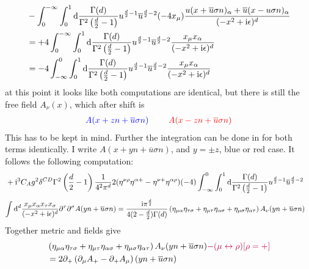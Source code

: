 {\color{red}
\begin{align}
	&-\int_{0}^{-\infty}\int_0^1 \text{d} \frac{\Gamma(d)}{\Gamma^2\left(\frac{d}{2}-1\right)} u^{\frac{d}{2}-1}\overline u ^{\frac{d}{2}-2}(-4x_\mu)\frac{u(x+\overline u \sigma n)_\alpha + \overline u(x- u\sigma n)_\alpha}{(-x^2+\text{i} \epsilon)^{d}}
	\\
	&=
	+4\int_{0}^{-\infty}\int_0^1 \text{d}  \frac{\Gamma(d)}{\Gamma^2\left(\frac{d}{2}-1\right)} u^{\frac{d}{2}-1}\overline u ^{\frac{d}{2}-2}\frac{x_\mu x_\alpha}{(-x^2+\text{i} \epsilon)^{d}}
	\\
	&=
	-4\int_{-\infty}^{0}\int_0^1 \text{d} \frac{\Gamma(d)}{\Gamma^2\left(\frac{d}{2}-1\right)} u^{\frac{d}{2}-1}\overline u ^{\frac{d}{2}-2}\frac{x_\mu x_\alpha}{(-x^2+\text{i} \epsilon)^{d}}
\end{align}
}
at this point it looks like both computations are identical, but there is still the free field $A_\nu(x)$, which after shift is
\begin{align}
	{\color{blue}A(x+zn+\overline u \sigma n)} ~~~~~~~ {\color{red}A(x-zn+\overline u \sigma n)}
\end{align}
This has to be kept in mind. 
Further the integration can be done in for both terms identically. I write $A(x+yn+\overline u \sigma n)$, and $y=\pm z$, blue or red case. It follows the following computation:
\begin{align}
	&+\text{i}^3 C_A g^2 \delta^{CD}\Gamma^2\left(\frac{d}{2}-1\right)\frac{1}{4^2\pi^d}2(\eta^{\nu \rho} \eta^{\alpha+} - \eta^{\nu +}\eta^{\alpha\rho})(-4)\int_{-\infty}^{0}\int_0^1 \text{d} \frac{\Gamma(d)}{\Gamma^2\left(\frac{d}{2}-1\right)} u^{\frac{d}{2}-1}\overline u ^{\frac{d}{2}-2}
\end{align}
\begin{align}
	 \int \text{d} ^d \frac{x_\mu x_\alpha x_\tau x_\sigma}{(-x^2+\text{i} \epsilon)^{d}}\partial^\tau \partial^\sigma A(yn+\overline u \sigma n) 
	 &= 
	\frac{\text{i} \pi^{\frac{d}{2}}}{4(2-\frac{d}{2})\Gamma(d)}\left(  \eta_{\mu \alpha} \eta_{\tau \sigma}+ \eta_{\mu \tau} \eta_{\alpha\sigma} + \eta_{\mu \sigma} \eta_{\alpha \tau} \right) A_\nu(yn+\overline u \sigma n)
\end{align}
Together metric  and fields give
\begin{align}
	&\left(  \eta_{\mu \alpha} \eta_{\tau \sigma}+ \eta_{\mu \tau} \eta_{\alpha\sigma} + \eta_{\mu \sigma} \eta_{\alpha \tau} \right) A_\nu(yn+\overline u \sigma n){\color{purple}- (\mu \leftrightarrow \rho)  [\rho = +]}
	\\
	&=2 \partial_+ \left( \partial_\mu A_+ - \partial_+ A_\mu \right)(yn+\overline u \sigma n)
\end{align}

